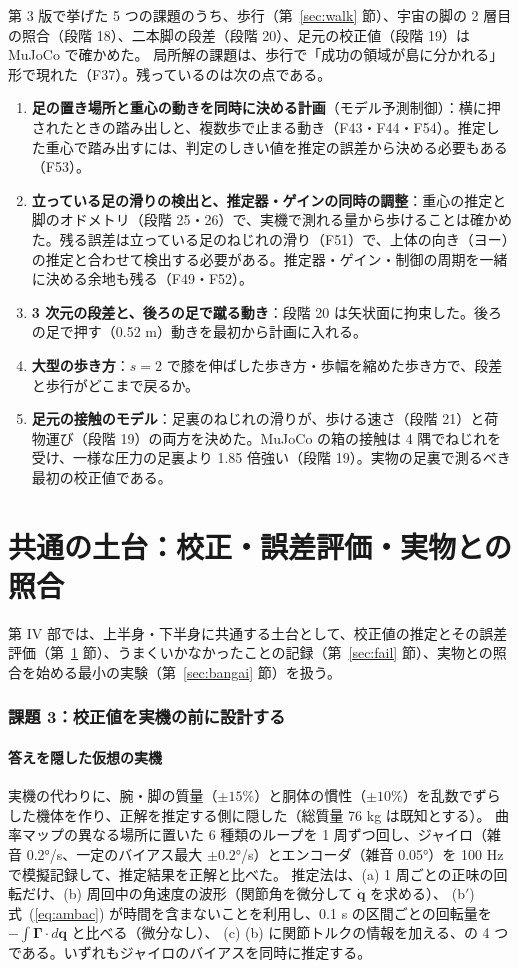\documentclass[paper=a4paper,fontsize=10pt,twocolumn,column_gap=2zw,line_length=24zw,number_of_lines=46,head_space=20mm]{jlreq}
\begin{document}
第 3 版で挙げた 5 つの課題のうち、歩行（第~\ref{sec:walk} 節）、宇宙の脚の 2 層目の照合（段階 18）、二本脚の段差（段階 20）、足元の校正値（段階 19）は MuJoCo で確かめた。
局所解の課題は、歩行で「成功の領域が島に分かれる」形で現れた（F37）。残っているのは次の点である。
\begin{enumerate}\setlength{\itemsep}{0pt}
\item \textbf{足の置き場所と重心の動きを同時に決める計画}（モデル予測制御）：横に押されたときの踏み出しと、複数歩で止まる動き（F43・F44・F54）。推定した重心で踏み出すには、判定のしきい値を推定の誤差から決める必要もある（F53）。
\item \textbf{立っている足の滑りの検出と、推定器・ゲインの同時の調整}：重心の推定と脚のオドメトリ（段階 25・26）で、実機で測れる量から歩けることは確かめた。残る誤差は立っている足のねじれの滑り（F51）で、上体の向き（ヨー）の推定と合わせて検出する必要がある。推定器・ゲイン・制御の周期を一緒に決める余地も残る（F49・F52）。
\item \textbf{3 次元の段差と、後ろの足で蹴る動き}：段階 20 は矢状面に拘束した。後ろの足で押す（0.52 m）動きを最初から計画に入れる。
\item \textbf{大型の歩き方}：$s=2$ で膝を伸ばした歩き方・歩幅を縮めた歩き方で、段差と歩行がどこまで戻るか。
\item \textbf{足元の接触のモデル}：足裏のねじれの滑りが、歩ける速さ（段階 21）と荷物運び（段階 19）の両方を決めた。MuJoCo の箱の接触は 4 隅でねじれを受け、一様な圧力の足裏より 1.85 倍強い（段階 19）。実物の足裏で測るべき最初の校正値である。
\end{enumerate}

\part{共通の土台：校正・誤差評価・実物との照合}

第 IV 部では、上半身・下半身に共通する土台として、校正値の推定とその誤差評価（第~\ref{sec:calib} 節）、うまくいかなかったことの記録（第~\ref{sec:fail} 節）、実物との照合を始める最小の実験（第~\ref{sec:bangai} 節）を扱う。

\section{課題 3：校正値を実機の前に設計する}\label{sec:calib}

\subsection{答えを隠した仮想の実機}
実機の代わりに、腕・脚の質量（$\pm15\%$）と胴体の慣性（$\pm10\%$）を乱数でずらした機体を作り、正解を推定する側に隠した（総質量 76 kg は既知とする）。
曲率マップの異なる場所に置いた 6 種類のループを 1 周ずつ回し、ジャイロ（雑音 0.2°/s、一定のバイアス最大 $\pm0.2$°/s）とエンコーダ（雑音 0.05°）を 100 Hz で模擬記録して、推定結果を正解と比べた。
推定法は、(a) 1 周ごとの正味の回転だけ、(b) 周回中の角速度の波形（関節角を微分して $\dot{\bm q}$ を求める）、
(b$'$) 式~(\ref{eq:ambac}) が時間を含まないことを利用し、0.1 s の区間ごとの回転量を $-\int\bm\Gamma\cdot d\bm q$ と比べる（微分なし）、
(c) (b) に関節トルクの情報を加える、の 4 つである。いずれもジャイロのバイアスを同時に推定する。
\end{document}
